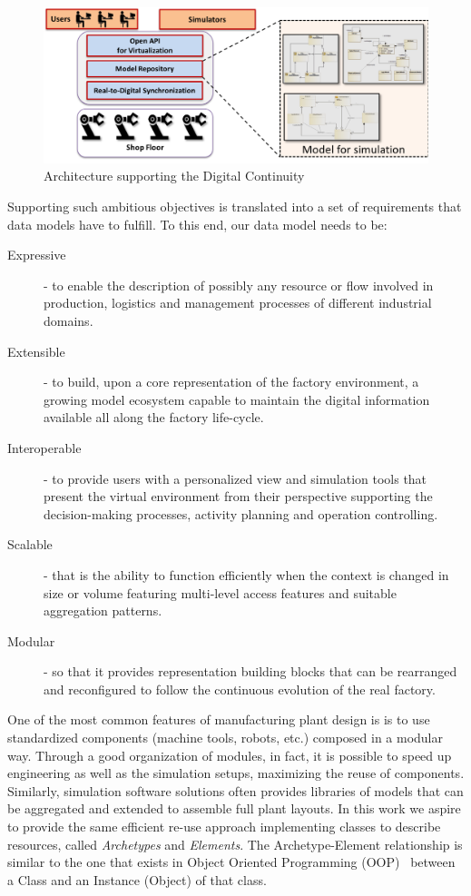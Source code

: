 \begin{figure}
	\centering
	\includegraphics[width=\linewidth]{images/Architecture}
	\caption{Architecture supporting the Digital Continuity}
	\label{fig:architectureSimulation}
\end{figure}





Supporting such ambitious objectives is translated into a set of requirements that data models have to fulfill. 
To this end, our data model needs to be:
\begin{description}
\item[Expressive]- to enable the description of possibly any resource or flow involved in production, logistics and management processes of different industrial domains.
\item[Extensible]- to build, upon a core representation of the factory environment, a growing model ecosystem capable to maintain the digital information available all along the factory life-cycle.
\item[Interoperable]- to provide users with a personalized view and simulation tools that present the virtual environment from their perspective supporting the decision-making processes, activity planning and operation controlling.
\item[Scalable]- that is the ability to function efficiently when the context is changed in size or volume featuring multi-level access features and suitable aggregation patterns.
\item[Modular]- so that it provides representation building blocks that can be rearranged and reconfigured to follow the continuous evolution  of the real factory.
\end{description}


One of the most common features of manufacturing plant design is is to use standardized components (machine tools, robots, etc.) composed in a modular way. 
Through a good organization of modules, in fact, it is possible to speed up engineering as well as the simulation setups, maximizing the reuse of components. 
Similarly, simulation software solutions often provides libraries of models that can be aggregated and extended to assemble full plant layouts.
In this work we aspire to provide the same efficient re-use approach implementing classes to describe resources, called \textit{Archetypes} and \textit{Elements}. %
The Archetype-Element relationship is similar to the one that exists in Object Oriented Programming (OOP)~\cite{wolfgang1994design} between a Class and an Instance (Object) of that class.

